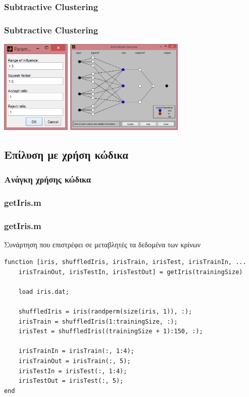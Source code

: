 \documentclass[xetex,serif,mathserif,14pt]{beamer}
\begin{document}
\subsubsection{Subtractive Clustering}
\begin{frame}
\frametitle{Subtractive Clustering}
\centering
\includegraphics[height=4.5cm]{images/subParam.png}
\includegraphics[height=4.5cm]{images/anfisModelSub.png}
\end{frame}
\subsection{Επίλυση με χρήση κώδικα}

\begin{frame}
\frametitle{Ανάγκη χρήσης κώδικα}

\end{frame}

\subsubsection{getIris.m}
\begin{frame}[fragile]
\frametitle{getIris.m}
Συνάρτηση που επιστρέφει σε μεταβλητές τα δεδομένα των κρίνων
\begin{lstlisting}
function [iris, shuffledIris, irisTrain, irisTest, irisTrainIn, ...
    irisTrainOut, irisTestIn, irisTestOut] = getIris(trainingSize)

    load iris.dat;

    shuffledIris = iris(randperm(size(iris, 1)), :);
    irisTrain = shuffledIris(1:trainingSize, :);
    irisTest = shuffledIris((trainingSize + 1):150, :);

    irisTrainIn = irisTrain(:, 1:4);
    irisTrainOut = irisTrain(:, 5);
    irisTestIn = irisTest(:, 1:4);
    irisTestOut = irisTest(:, 5);
end
\end{lstlisting}
\end{frame}
\end{document}
